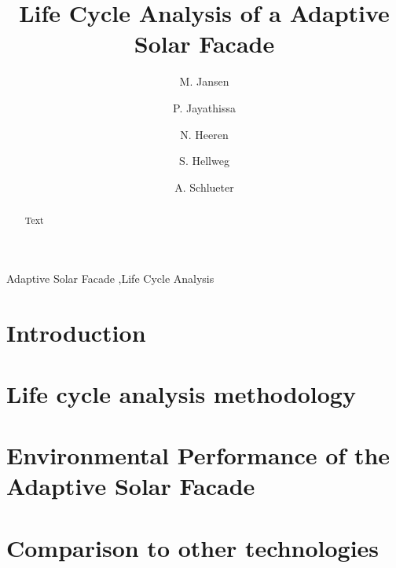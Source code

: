 \documentclass[preprint,12pt]{elsarticle}
\begin{document}
\begin{frontmatter}

\title{Life Cycle Analysis of a Adaptive Solar Facade} 

\author[ita]{M. Jansen}

\author[ita]{P. Jayathissa}

\author[baug]{N. Heeren}

\author[baug]{S. Hellweg}

\author[ita]{A. Schlueter}



\address[ita]{Architecture and Building Systems, Institute of Technology in Architecture,\\ ETH Zurich, Switzerland} 
\address[baug]{Ecological System Design, Institute of Environmental Engineering,\\ ETH Zurich, Switzerland}

\begin{abstract}
Text 
\end{abstract}

\begin{keyword}
Adaptive Solar Facade \sep Life Cycle Analysis
\end{keyword}

\end{frontmatter}

\section{Introduction}
\label{ch:introduction}


\section{Life cycle analysis methodology}
\label{ch:method}


\section{Environmental Performance of the Adaptive Solar Facade}
\label{ch:profile}


\section{Comparison to other technologies}
\label{ch:comparison}

\end{document}
